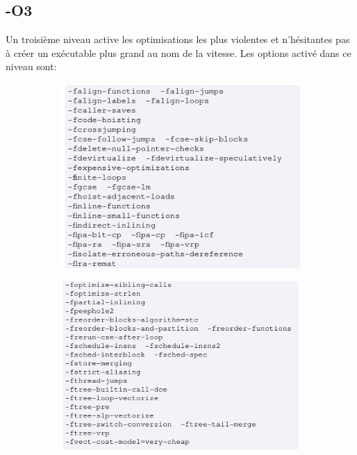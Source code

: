 \documentclass[11pt]{article} %
\begin{document}
\subsection*{-O3}

Un troisième niveau active les optimisations les plus violentes et n'hésitantes pas à créer un exécutable plus grand au nom de la vitesse.
Les options activé dans ce niveau sont:
\newpage

\begin{figure}[h!]
    \centering
    \begin{subfigure}[h!]{0.49\textwidth}
        \includegraphics[height=.8\linewidth]{./media/O2top}
    \end{subfigure}
    \begin{subfigure}[h!]{0.49\textwidth}
        \includegraphics[height=.8\linewidth]{./media/O2bot}
    \end{subfigure}
\end{figure}
\end{document}
